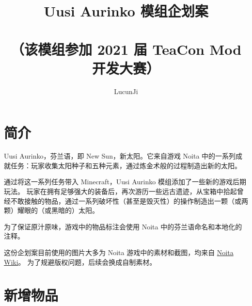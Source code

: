 \documentclass[11pt]{article}
\title{Uusi Aurinko 模组企划案\\
\ \\
\small{（该模组参加 2021 届 TeaCon Mod 开发大赛）}}
\author{LucunJi}
\begin{document}
    \maketitle
    \tableofcontents

    \clearpage
    \section{简介}\label{sec:intro}
    Uusi Aurinko，芬兰语，即 New Sun，新太阳。它来自游戏 Noita 中的一系列成就任务：玩家收集太阳种子和五种元素，通过炼金术般的过程制造出新的太阳。

    通过将这一系列任务带入 Minecraft，Uusi Aurinko 模组添加了一些新的游戏后期玩法。
    玩家在拥有足够强大的装备后，再次游历一些远古遗迹，从宝箱中拾起曾经不敢接触的物品，通过一系列破坏性（甚至是毁灭性）的操作制造出一颗（或两颗）耀眼的（或黑暗的）太阳。

    为了保证原汁原味，游戏中的物品标注会使用 Noita 中的芬兰语命名和本地化的注释。

    \vspace{1em}
    这份企划案目前使用的图片大多为 Noita 游戏中的素材和截图，均来自 \href{https://noita.fandom.com/wiki/Noita_Wiki}{Noita Wiki}。
    为了规避版权问题，后续会换成自制素材。

    \clearpage
    \section{新增物品}\label{sec:new-items}
\end{document}

